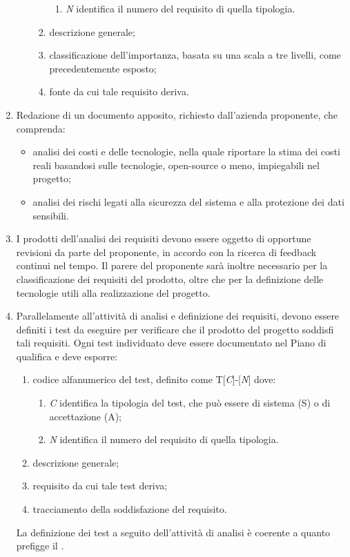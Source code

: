 \begin{enumerate}
\begin{itemize}
\begin{enumerate}
\begin{enumerate}
            \item \textit{N} identifica il numero del requisito di quella tipologia.
        \end{enumerate}
        \item descrizione generale;
        \item classificazione dell'importanza, basata su una scala a tre livelli, come precedentemente esposto;
        \item fonte da cui tale requisito deriva.
    \end{enumerate}
    \end{itemize}
    \item Redazione di un documento apposito, richiesto dall'azienda proponente, che comprenda:
    \begin{itemize}
    \item analisi dei costi e delle tecnologie, nella quale riportare la stima dei costi reali basandosi sulle tecnologie, open-source o meno, impiegabili nel progetto;
    \item analisi dei rischi legati alla sicurezza del sistema e alla protezione dei dati sensibili.
    \end{itemize}
    \item I prodotti dell'analisi dei requisiti devono essere oggetto di opportune revisioni da parte del proponente, in accordo con la ricerca di feedback continui nel tempo. Il parere del proponente sarà inoltre necessario per la classificazione dei requisiti del prodotto, oltre che per la definizione delle tecnologie utili alla realizzazione del progetto.
    \item Parallelamente all'attività di analisi e definizione dei requisiti, devono essere definiti i test da eseguire per verificare che il prodotto del progetto soddisfi tali requisiti. Ogni test individuato deve essere documentato nel Piano di qualifica e deve esporre:
    \begin{enumerate}
        \item codice alfanumerico del test, definito come T[\textit{C}]-[\textit{N}] dove:
        \begin{enumerate}
            \item \textit{C} identifica la tipologia del test, che può essere di sistema (S) o di accettazione (A);
            \item \textit{N} identifica il numero del requisito di quella tipologia.
        \end{enumerate}
        \item descrizione generale;
        \item requisito da cui tale test deriva;
        \item tracciamento della soddisfazione del requisito.
    \end{enumerate}
    La definizione dei test a seguito dell'attività di analisi è coerente a quanto prefigge il .
\end{enumerate}


